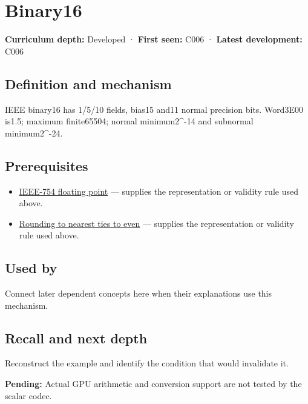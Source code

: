 \hypertarget{appendix-34443cec7170}{}
\section{Binary16}\label{appendix-34443cec7170-binary16}

\textbf{Curriculum depth:} Developed · \textbf{First seen:} C006 · \textbf{Latest development:} C006

\subsection{Definition and mechanism}\label{appendix-34443cec7170-definition-and-mechanism}

IEEE binary16 has 1/5/10 fields, bias15 and11 normal precision bits. Word3E00 is1.5; maximum finite65504; normal minimum2\^{}-14 and subnormal minimum2\^{}-24.

\subsection{Prerequisites}\label{appendix-34443cec7170-prerequisites}

\begin{itemize}
\tightlist
\item
  \hyperref[appendix-343615f49ddf]{IEEE-754 floating point} --- supplies the representation or validity rule used above.
\item
  \hyperref[appendix-614afe1de592]{Rounding to nearest ties to even} --- supplies the representation or validity rule used above.
\end{itemize}

\subsection{Used by}\label{appendix-34443cec7170-used-by}

Connect later dependent concepts here when their explanations use this mechanism.

\subsection{Recall and next depth}\label{appendix-34443cec7170-recall-and-next-depth}

Reconstruct the example and identify the condition that would invalidate it.

\textbf{Pending:} Actual GPU arithmetic and conversion support are not tested by the scalar codec.


